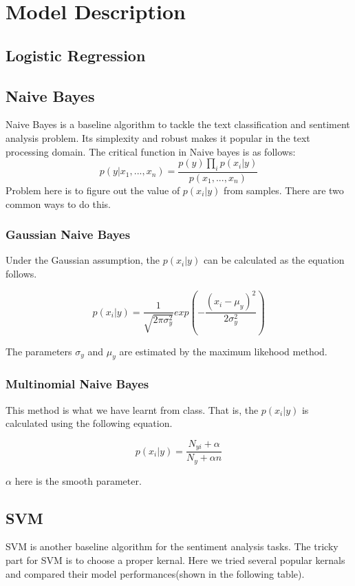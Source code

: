 \documentclass[letterpaper]{article} %
\begin{document}
\section{Model Description}

\subsection{Logistic Regression}

\subsection{Naive Bayes}

Naive Bayes is a baseline algorithm to tackle the text classification and sentiment analysis problem. Its simplexity and robust makes it popular in the text processing domain. The critical function in Naive bayes is as follows: 
$$p(y|x_1,...,x_n) = \frac{p(y)\prod_i p(x_i|y)}{p(x_1,...,x_n)}$$
Problem here is to figure out the value of $p(x_i|y)$ from samples. There are two common ways to do this.
\subsubsection{Gaussian Naive Bayes}

Under the Gaussian assumption, the $p(x_i|y)$ can be calculated as the equation follows.

$$p(x_i|y) = \frac{1}{\sqrt{2\pi \sigma_y^2}}exp(-\frac{(x_i-\mu_y)^2}{2\sigma_y^2})$$

The parameters $\sigma_y$ and $\mu_y$ are estimated by the maximum likehood method.

\subsubsection{Multinomial Naive Bayes}

This method is what we have learnt from class. That is, the $p(x_i|y)$ is calculated using the following equation.

$$p(x_i|y)=\frac{N_{yi}+\alpha}{N_y+\alpha n}$$

$\alpha$ here is the smooth parameter.

\subsection{SVM}

SVM is another baseline algorithm for the sentiment analysis tasks. The tricky part for SVM is to choose a proper kernal. Here we tried several popular kernals and compared their model performances(shown in the following table).
\end{document}
